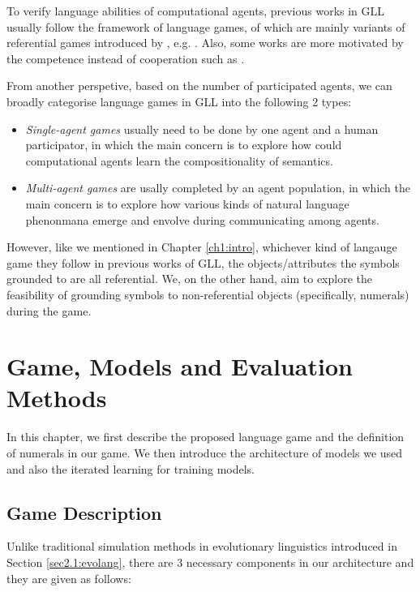 \documentclass[msc,deptreport]{infthesis} %
\begin{document}
To verify language abilities of computational agents, previous works in GLL usually follow the framework of language games, of which are mainly variants of referential games introduced by \cite{lewis2008convention}, e.g. \cite{hermann2017grounded, havrylov2017emergence}. Also, some works are more motivated by the competence instead of cooperation such as \cite{cao2018emergent}.

From another perspetive, based on the number of participated agents, we can broadly categorise language games in GLL into the following 2 types:
\begin{itemize}
  \item \textit{Single-agent games} usually need to be done by one agent and a human participator, in which the main concern is to explore how could computational agents learn the compositionality of semantics.
  \item \textit{Multi-agent games} are usally completed by an agent population, in which the main concern is to explore how various kinds of natural language phenonmana emerge and envolve during communicating among agents.
\end{itemize}

However, like we mentioned in Chapter \ref{ch1:intro}, whichever kind of langauge game they follow in previous works of GLL, the objects/attributes the symbols grounded to are all referential. We, on the other hand, aim to explore the feasibility of grounding symbols to non-referential objects (specifically, numerals) during the game.


\chapter{Game, Models and Evaluation Methods}
\label{ch3:game_model}

In this chapter, we first describe the proposed language game and the definition of numerals in our game. We then introduce the architecture of models we used and also the iterated learning for training models.

\section{Game Description}
\label{sec3.1:game_description}

Unlike traditional simulation methods in evolutionary linguistics introduced in Section \ref{sec2.1:evolang}, there are 3 necessary components in our architecture and they are given as follows:
\end{document}
